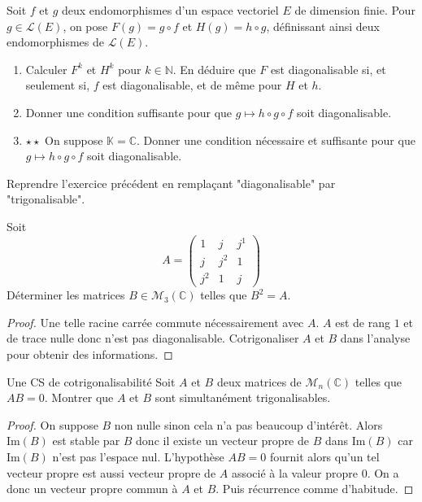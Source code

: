 \documentclass[french,a4paper]{article}
\newcommand{\N}{\mathbb{N}}
\newcommand{\C}{\mathbb{C}}
\newcommand{\K}{\mathbb{K}}
\newcommand{\im}{\text{Im}}
\theoremstyle{plain}
\theoremstyle{definition}
\theoremstyle{remark}
\begin{document}
\begin{ex}{}
	Soit $f$ et $g$ deux endomorphismes d'un espace vectoriel $E$ de dimension finie. Pour $g\in\mathcal{L}(E)$, on pose $F(g)=g\circ f$ et $H(g)=h\circ g$, définissant ainsi deux endomorphismes de $\mathcal{L}(E)$.
	\begin{enumerate}
		\item Calculer $F^k$ et $H^k$ pour $k\in\N$. En déduire que $F$ est diagonalisable si, et seulement si, $f$ est diagonalisable, et de même pour $H$ et $h$.
		\item Donner une condition suffisante pour que $g\mapsto h\circ g\circ f$ soit diagonalisable.
		\item $\star\star$ On suppose $\K=\C$. Donner une condition nécessaire et suffisante pour que $g\mapsto h\circ g\circ f$ soit diagonalisable.
	\end{enumerate}
\end{ex}

\begin{ex}{}
	Reprendre l'exercice précédent en remplaçant "diagonalisable" par "trigonalisable".
\end{ex}

\begin{ex}{}
	Soit $$A=\begin{pmatrix}
		1&j&j^1\\
		j&j^2&1\\
		j^2&1&j
	\end{pmatrix}$$ Déterminer les matrices $B\in\mathcal{M}_3(\C)$ telles que $B^2=A$.
\end{ex}
\begin{proof}
	Une telle racine carrée commute nécessairement avec $A$. $A$ est de rang $1$ et de trace nulle donc n'est pas diagonalisable. Cotrigonaliser $A$ et $B$ dans l'analyse pour obtenir des informations.
\end{proof}

\begin{ex}{Une CS de cotrigonalisabilité}
	Soit $A$ et $B$ deux matrices de $\mathcal{M}_n(\C)$ telles que $AB=0$. Montrer que $A$ et $B$ sont simultanément trigonalisables.
\end{ex}
\begin{proof}
	On suppose $B$ non nulle sinon cela n'a pas beaucoup d'intérêt. Alors $\im(B)$ est stable par $B$ donc il existe un vecteur propre de $B$ dans $\im(B)$ car $\im(B)$ n'est pas l'espace nul. L'hypothèse $AB=0$ fournit alors qu'un tel vecteur propre est aussi vecteur propre de $A$ associé à la valeur propre $0$. On a donc un vecteur propre commun à $A$ et $B$. Puis récurrence comme d'habitude.
\end{proof}
\end{document}
